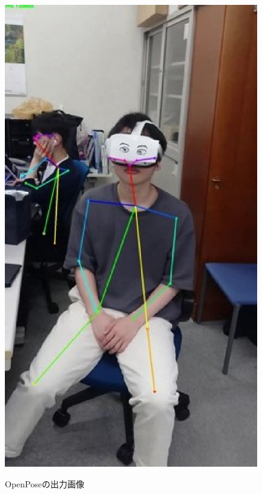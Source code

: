 \begin{figure}[h]
\begin{minipage}[h]{0.25\hsize}
      \includegraphics[width=0.98\textwidth]{./fig/attached.eps}
      \label{fig:attatched}
    \end{minipage}
    \vspace{0.5mm}
    \caption{OpenPoseの出力画像}
    \label{fig:openpose}
\end{figure}
\vspace{-1.2mm}
